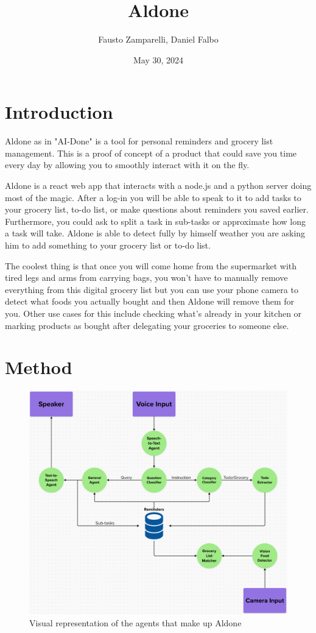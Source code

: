 \documentclass{article}
\title{\textbf{Aldone}}
\author{Fausto Zamparelli, Daniel Falbo}
\date{May 30, 2024}
\begin{document}
\maketitle

\section*{\color{draculagreen}Introduction}
Aldone as in "AI-Done" is a tool for personal reminders and grocery list management.
This is a proof of concept of a product that could save you time every day by allowing you
to smoothly interact with it on the fly.

Aldone is a react web app that interacts with a node.js and a python server doing most of the magic.
After a log-in you will be able to speak to it to add tasks to your grocery list, to-do list,
or make questions about reminders you saved earlier.
Furthermore, you could ask to split a task in sub-tasks or approximate how long a task will take.
Aldone is able to detect fully by himself weather you are asking him to add something to your grocery list or to-do list.

The coolest thing is that once you will come home from the supermarket with tired legs and arms from carrying bags, you won't have to manually remove everything from this digital grocery list but you can use your phone camera to detect what foods you actually bought and then Aldone will remove them for you. Other use cases for this include checking what's already in your kitchen or marking products as bought after delegating your groceries to someone else.

\newpage

\section*{\color{draculagreen}Method} 
\begin{figure}[htbp]
\centering
\includegraphics[width=\textwidth]{diagram.png}
\caption{\small Visual representation of the agents that make up Aldone}
\end{figure}
\end{document}
